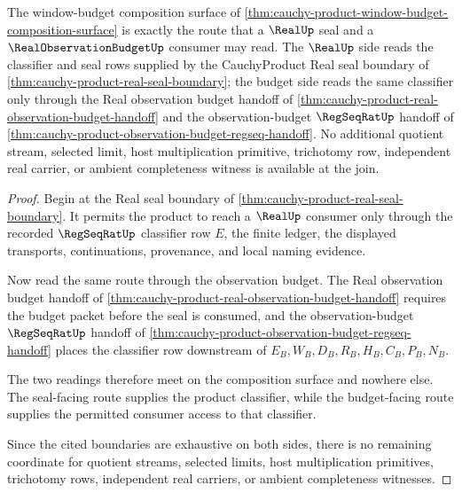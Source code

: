 \begin{theorem}
\label{thm:cauchy-product-budget-real-seal-compatibility}
The window-budget composition surface of \autoref{thm:cauchy-product-window-budget-composition-surface} is exactly the route that a $\RealUp$ seal and a $\RealObservationBudgetUp$ consumer may read. The $\RealUp$ side reads the classifier and seal rows supplied by the CauchyProduct Real seal boundary of \autoref{thm:cauchy-product-real-seal-boundary}; the budget side reads the same classifier only through the Real observation budget handoff of \autoref{thm:cauchy-product-real-observation-budget-handoff} and the observation-budget $\RegSeqRatUp$ handoff of \autoref{thm:cauchy-product-observation-budget-regseq-handoff}. No additional quotient stream, selected limit, host multiplication primitive, trichotomy row, independent real carrier, or ambient completeness witness is available at the join.
\end{theorem}
\begin{proof}
Begin at the Real seal boundary of \autoref{thm:cauchy-product-real-seal-boundary}. It permits the product to reach a $\RealUp$ consumer only through the recorded $\RegSeqRatUp$ classifier row $E$, the finite ledger, the displayed transports, continuations, provenance, and local naming evidence.

Now read the same route through the observation budget. The Real observation budget handoff of \autoref{thm:cauchy-product-real-observation-budget-handoff} requires the budget packet before the seal is consumed, and the observation-budget $\RegSeqRatUp$ handoff of \autoref{thm:cauchy-product-observation-budget-regseq-handoff} places the classifier row downstream of $E_B,W_B,D_B,R_B,H_B,C_B,P_B,N_B$.

The two readings therefore meet on the composition surface and nowhere else. The seal-facing route supplies the product classifier, while the budget-facing route supplies the permitted consumer access to that classifier.

Since the cited boundaries are exhaustive on both sides, there is no remaining coordinate for quotient streams, selected limits, host multiplication primitives, trichotomy rows, independent real carriers, or ambient completeness witnesses.
\end{proof}


